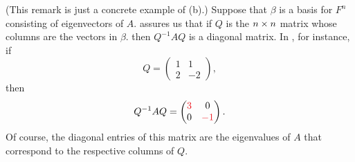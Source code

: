 \begin{remark} \label{remark 5.1.8}
(This remark is just a concrete example of (b).)
Suppose that \(\beta\) is a basis for \(F^n\) consisting of eigenvectors of \(A\).
 assures us that if \(Q\) is the \(n \times n\) matrix whose columns are the vectors in \(\beta\). then \(Q^{-1} A Q\) is a diagonal matrix.
In , for instance, if
\[
    Q = \begin{pmatrix} 1 & 1 \\ 2 & -2 \end{pmatrix},
\]
then
\[
    Q^{-1} A Q = \begin{pmatrix} \RED{3} & 0 \\ 0 & \RED{-1} \end{pmatrix}.
\]
Of course, the diagonal entries of this matrix are the eigenvalues of \(A\) that correspond to the respective columns of \(Q\).
\end{remark}

